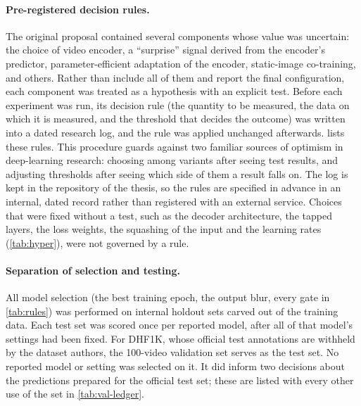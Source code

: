 \paragraph{Pre-registered decision rules.} The original proposal contained
several components whose value was uncertain: the choice of video
encoder, a \enquote{surprise} signal derived from the encoder's predictor,
parameter-efficient adaptation of the encoder, static-image co-training, and
others. Rather than include all of them and report the final configuration,
each component was treated as a hypothesis with an explicit test. Before
each experiment was run, its decision rule (the quantity to be measured,
the data on which it is measured, and the threshold that decides the
outcome) was written into a dated research log, and the rule was applied
unchanged afterwards.  lists these rules. This procedure
guards against two familiar sources of optimism in deep-learning research:
choosing among variants after seeing test results, and adjusting thresholds
after seeing which side of them a result falls on. The log is kept in the
repository of the thesis, so the rules are specified in advance in an internal,
dated record rather than registered with an external service. Choices that were
fixed without a test, such as the decoder architecture, the tapped layers, the
loss weights, the squashing of the input and the learning rates
(\cref{tab:hyper}), were not governed by a rule.

\paragraph{Separation of selection and testing.} All model selection
(the best training epoch, the output blur, every gate in \cref{tab:rules})
was performed on internal holdout sets carved out of the training data.
Each test set was scored once per reported model, after all of that model's
settings had been fixed. For DHF1K, whose official test annotations are
withheld by the dataset authors, the 100-video validation set serves as the
test set. No reported model or setting was selected on it. It did inform two
decisions about the predictions prepared for the official test set; these are
listed with every other use of the set in \cref{tab:val-ledger}.

